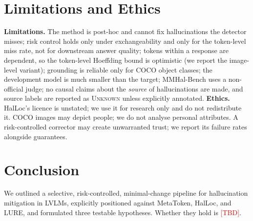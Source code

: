 \documentclass[11pt]{article}
\newcommand{\TBD}{\textcolor{red}{[TBD]}}
\begin{document}
\section{Limitations and Ethics}
\label{sec:limits}
\textbf{Limitations.} The method is post-hoc and cannot fix hallucinations the detector misses; risk control holds only under exchangeability and only for the token-level miss rate, not for downstream answer quality; tokens within a response are dependent, so the token-level Hoeffding bound is optimistic (we report the image-level variant); grounding is reliable only for COCO object classes; the development model is much smaller than the target; MMHal-Bench uses a non-official judge; no causal claims about the \emph{source} of hallucinations are made, and source labels are reported as \textsc{Unknown} unless explicitly annotated.
\textbf{Ethics.} HalLoc's licence is unstated; we use it for research only and do not redistribute it. COCO images may depict people; we do not analyse personal attributes. A risk-controlled corrector may create unwarranted trust; we report its failure rates alongside guarantees.

\section{Conclusion}
\label{sec:conclusion}
We outlined a selective, risk-controlled, minimal-change pipeline for hallucination mitigation in LVLMs, explicitly positioned against MetaToken, HalLoc, and LURE, and formulated three testable hypotheses. Whether they hold is \TBD.



\end{document}
